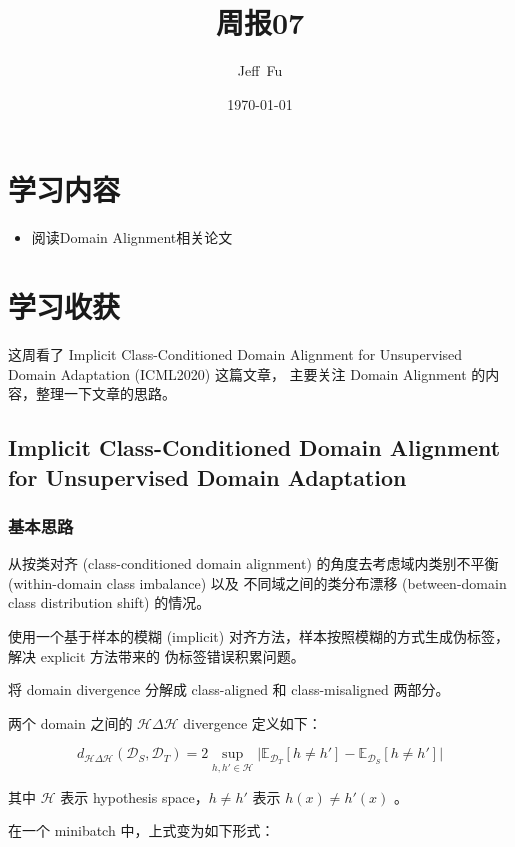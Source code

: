 \documentclass[UTF8]{ctexart}
\title{周报07}
\author{Jeff\ Fu}
\date{\today}
\begin{document}
    \maketitle
    \section{学习内容}
        \begin{itemize}
            \item 阅读Domain Alignment相关论文
        \end{itemize}
    \section{学习收获}
        这周看了 Implicit Class-Conditioned Domain Alignment for Unsupervised Domain Adaptation (ICML2020) 这篇文章，
        主要关注 Domain Alignment 的内容，整理一下文章的思路。
        \subsection{Implicit Class-Conditioned Domain Alignment for Unsupervised Domain Adaptation}
            \subsubsection{基本思路}
                从按类对齐 (class-conditioned domain alignment) 的角度去考虑域内类别不平衡 (within-domain class imbalance) 以及
                不同域之间的类分布漂移 (between-domain class distribution shift) 的情况。

                使用一个基于样本的模糊 (implicit) 对齐方法，样本按照模糊的方式生成伪标签，解决 explicit 方法带来的
                伪标签错误积累问题。

                将 domain divergence 分解成 class-aligned 和 class-misaligned 两部分。

                两个 domain 之间的 $\mathcal H \Delta \mathcal H$ divergence 定义如下：

                $$
                    d_{\mathcal{H}\Delta\mathcal{H}}(\mathcal{D}_S, \mathcal{D}_T)=2 \sup_{h, h' \in \mathcal{H}}\vert \mathbb E_{\mathcal{D}_T}  \left[ h\neq h' \right]-  \mathbb E_{\mathcal{D}_S}\left [ h\neq h' \right ]\vert
                $$

                其中 $\mathcal H$ 表示 hypothesis space，$h \neq h'$ 表示 $h(x)\neq h'(x)$ 。

                在一个 minibatch 中，上式变为如下形式：
\end{document}
